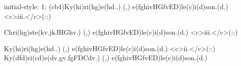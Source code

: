 initial-style: 1;
(cb4)Ky(hi)ri(hg)e(hd..) (,) e(fghivHGfvED)le(c)i(d)son.(d.) <c>iii.</c>(::)

Chri(hg)ste(kv.jkJHGhv.) (,) e(fghivHGfvED)le(c)i(d)son.(d.) <c>iii.</c>(::)

Ky(hi)ri(hg)e(hd..) (,) e(fghivHGfvED)le(c)i(d)son.(d.) <c>ii.</c>(::) Ky(dfd)ri(cd)e(dv.gv.fgFDCdv.) (,) e(fghivHGfvED)le(c)i(d)son.(d.)
